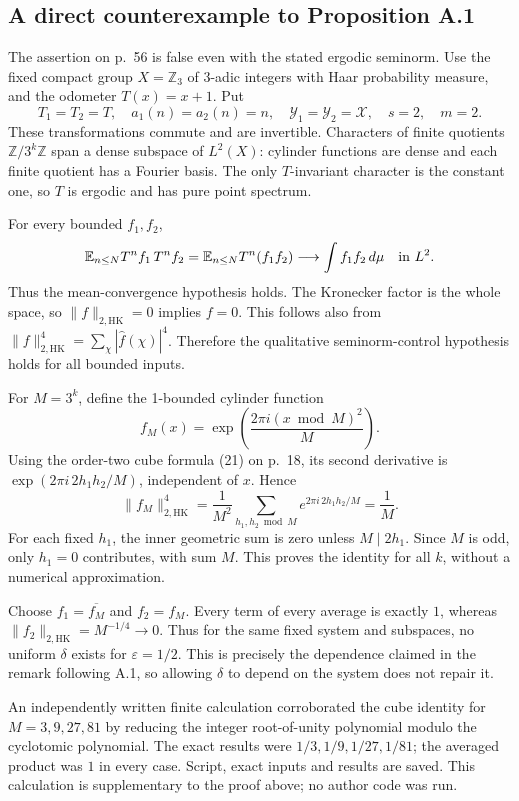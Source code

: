 \documentclass[10pt]{article}
\begin{document}
\subsection*{A direct counterexample to Proposition A.1}
The assertion on p. 56 is false even with the stated ergodic seminorm. Use the fixed compact group \(X=\mathbb Z_3\) of 3-adic integers with Haar probability measure, and the odometer \(T(x)=x+1\). Put \[T_1=T_2=T,\quad a_1(n)=a_2(n)=n,\quad
 \mathcal Y_1=\mathcal Y_2=\mathcal X,\quad s=2,\quad m=2.\] These transformations commute and are invertible. Characters of finite quotients \(\mathbb Z/3^k\mathbb Z\) span a dense subspace of \(L^2(X)\): cylinder functions are dense and each finite quotient has a Fourier basis. The only \(T\)-invariant character is the constant one, so \(T\) is ergodic and has pure point spectrum.\par
For every bounded \(f_1,f_2\), \[\mathbb E_{n\le N} T^n f_1\,T^n f_2
 =\mathbb E_{n\le N}T^n(f_1f_2)\longrightarrow\int f_1f_2\,d\mu
 \quad\hbox{in }L^2.\] Thus the mean-convergence hypothesis holds. The Kronecker factor is the whole space, so \(\lVert f\rVert_{2,\mathrm{HK}}=0\) implies \(f=0\). This follows also from \(\lVert f\rVert_{2,\mathrm{HK}}^4=\sum_\chi|\widehat f(\chi)|^4\). Therefore the qualitative seminorm-control hypothesis holds for all bounded inputs.\par
For \(M=3^k\), define the 1-bounded cylinder function \[f_M(x)=\exp\left(\frac{2\pi i(x\bmod M)^2}{M}\right).\] Using the order-two cube formula (21) on p. 18, its second derivative is \(\exp(2\pi i\,2h_1h_2/M)\), independent of \(x\). Hence \[\lVert f_M\rVert_{2,\mathrm{HK}}^4
 =\frac1{M^2}\sum_{h_1,h_2\bmod M}e^{2\pi i\,2h_1h_2/M}
 =\frac1M.\] For each fixed \(h_1\), the inner geometric sum is zero unless \(M\mid2h_1\). Since \(M\) is odd, only \(h_1=0\) contributes, with sum \(M\). This proves the identity for all \(k\), without a numerical approximation.\par
Choose \(f_1=\overline{f_M}\) and \(f_2=f_M\). Every term of every average is exactly \(1\), whereas \(\lVert f_2\rVert_{2,\mathrm{HK}}=M^{-1/4}\to0\). Thus for the same fixed system and subspaces, no uniform \(\delta\) exists for \(\varepsilon=1/2\). This is precisely the dependence claimed in the remark following A.1, so allowing \(\delta\) to depend on the system does not repair it.\par
An independently written finite calculation corroborated the cube identity for \(M=3,9,27,81\) by reducing the integer root-of-unity polynomial modulo the cyclotomic polynomial. The exact results were \(1/3,1/9,1/27,1/81\); the averaged product was \(1\) in every case. Script, exact inputs and results are saved. This calculation is supplementary to the proof above; no author code was run.\par
\end{document}

